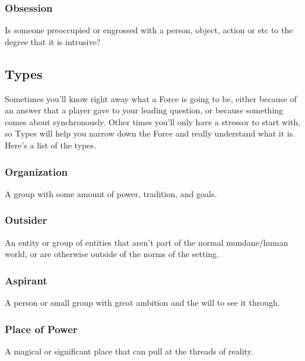 \documentclass[
]{article}
\begin{document}
\hypertarget{obsession}{%
\subsubsection{Obsession}\label{obsession}}

Is someone preoccupied or engrossed with a person, object, action or etc
to the degree that it is intrusive?

\hypertarget{types}{%
\subsection{Types}\label{types}}

Sometimes you'll know right away what a Force is going to be, either
because of an answer that a player gave to your leading question, or
because something comes about synchronously. Other times you'll only
have a stressor to start with, so Types will help you narrow down the
Force and really understand what it is. Here's a list of the types.

\hypertarget{organization}{%
\subsubsection{Organization}\label{organization}}

A group with some amount of power, tradition, and goals.

\hypertarget{outsider}{%
\subsubsection{Outsider}\label{outsider}}

An entity or group of entities that aren't part of the normal
mundane/human world, or are otherwise outside of the norms of the
setting.

\hypertarget{aspirant}{%
\subsubsection{Aspirant}\label{aspirant}}

A person or small group with great ambition and the will to see it
through.

\hypertarget{place-of-power-4}{%
\subsubsection{Place of Power}\label{place-of-power-4}}

A magical or significant place that can pull at the threads of reality.
\end{document}
